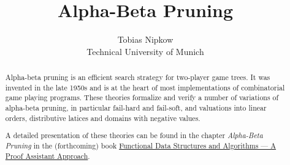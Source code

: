 \documentclass[11pt,a4paper]{report}
\begin{document}
\title{Alpha-Beta Pruning}
\author{Tobias Nipkow\\Technical University of Munich}
\maketitle

\begin{abstract}
Alpha-beta pruning is an efficient search strategy for two-player game trees.
It was invented in the late 1950s and is at the heart of most implementations
of combinatorial game playing programs. These theories formalize and verify a number of
variations of alpha-beta pruning, in particular fail-hard and fail-soft,
and valuations into linear orders, distributive latices and domains with negative values.

A detailed presentation of these theories can be found in the chapter \emph{Alpha-Beta Pruning}
in the (forthcoming) book
\href{https://functional-algorithms-verified.org/functional_data_structures_algorithms.pdf}{Functional Data Structures and Algorithms --- A Proof Assistant Approach}.
\end{abstract}

{\renewcommand{\isanewline}{\\}

}


\newpage
\tableofcontents
\newpage


\end{document}
